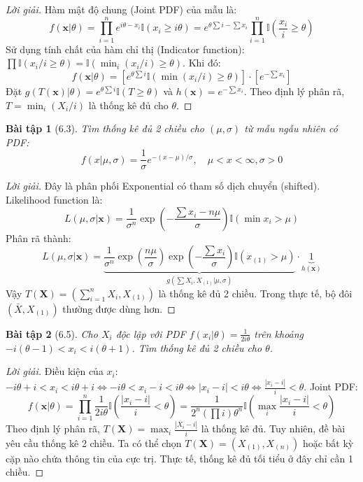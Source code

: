 \documentclass[8pt,a4paper]{article}
\newtheorem{exercise}{Bài tập}
\newenvironment{solution}{\begin{proof}[Lời giải]}{\end{proof}}
\begin{document}
\begin{solution}
Hàm mật độ chung (Joint PDF) của mẫu là:
\[ f(\mathbf{x}|\theta) = \prod_{i=1}^n e^{i\theta-x_i} \mathbb{I}(x_i \ge i\theta) = e^{\theta \sum i - \sum x_i} \prod_{i=1}^n \mathbb{I}\left(\frac{x_i}{i} \ge \theta\right) \]
Sử dụng tính chất của hàm chỉ thị (Indicator function): $\prod \mathbb{I}(x_i/i \ge \theta) = \mathbb{I}(\min_i(x_i/i) \ge \theta)$.
Khi đó:
\[ f(\mathbf{x}|\theta) = \left[ e^{\theta \sum i} \mathbb{I}(\min(x_i/i) \ge \theta) \right] \cdot \left[ e^{-\sum x_i} \right] \]
Đặt $g(T(\mathbf{x})|\theta) = e^{\theta \sum i} \mathbb{I}(T \ge \theta)$ và $h(\mathbf{x}) = e^{-\sum x_i}$.
Theo định lý phân rã, $T = \min_i(X_i/i)$ là thống kê đủ cho $\theta$.
\end{solution}

\begin{exercise}[6.3]
Tìm thống kê đủ 2 chiều cho $(\mu, \sigma)$ từ mẫu ngẫu nhiên có PDF:
\[ f(x|\mu, \sigma) = \frac{1}{\sigma} e^{-(x-\mu)/\sigma}, \quad \mu < x < \infty, \sigma > 0 \]
\end{exercise}

\begin{solution}
Đây là phân phối Exponential có tham số dịch chuyển (shifted). Likelihood function là:
\[ L(\mu, \sigma | \mathbf{x}) = \frac{1}{\sigma^n} \exp\left( -\frac{\sum x_i - n\mu}{\sigma} \right) \mathbb{I}(\min x_i > \mu) \]
Phân rã thành:
\[ L(\mu, \sigma | \mathbf{x}) = \underbrace{\frac{1}{\sigma^n} \exp\left( \frac{n\mu}{\sigma} \right) \exp\left( -\frac{\sum x_i}{\sigma} \right) \mathbb{I}(x_{(1)} > \mu)}_{g(\sum X_i, X_{(1)} | \mu, \sigma)} \cdot \underbrace{1}_{h(\mathbf{x})} \]
Vậy $T(\mathbf{X}) = \left( \sum_{i=1}^n X_i, X_{(1)} \right)$ là thống kê đủ 2 chiều. Trong thực tế, bộ đôi $(\bar{X}, X_{(1)})$ thường được dùng hơn.
\end{solution}

\begin{exercise}[6.5]
Cho $X_i$ độc lập với PDF $f(x_i|\theta) = \frac{1}{2i\theta}$ trên khoảng $-i(\theta-1) < x_i < i(\theta+1)$. Tìm thống kê đủ 2 chiều cho $\theta$.
\end{exercise}

\begin{solution}
Điều kiện của $x_i$: 
$ -i\theta + i < x_i < i\theta + i \iff -i\theta < x_i - i < i\theta \iff |x_i - i| < i\theta \iff \frac{|x_i - i|}{i} < \theta$.
Joint PDF:
\[ f(\mathbf{x}|\theta) = \prod_{i=1}^n \frac{1}{2i\theta} \mathbb{I}\left( \frac{|x_i - i|}{i} < \theta \right) = \frac{1}{2^n (\prod i) \theta^n} \mathbb{I}\left( \max_i \frac{|x_i - i|}{i} < \theta \right) \]
Theo định lý phân rã, $T(\mathbf{X}) = \max_i \frac{|X_i - i|}{i}$ là thống kê đủ. Tuy nhiên, đề bài yêu cầu thống kê 2 chiều. Ta có thể chọn $T(\mathbf{X}) = (X_{(1)}, X_{(n)})$ hoặc bất kỳ cặp nào chứa thông tin của cực trị. Thực tế, thống kê đủ tối tiểu ở đây chỉ cần 1 chiều. 
\end{solution}
\end{document}
